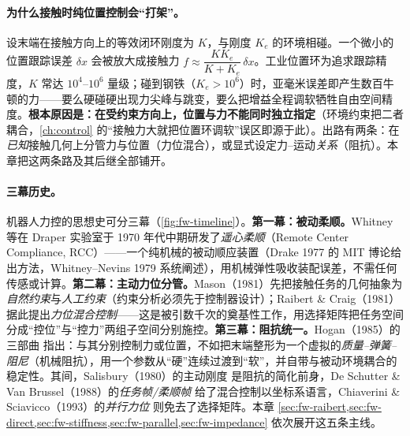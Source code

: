 \paragraph{为什么接触时纯位置控制会“打架”。}
设末端在接触方向上的等效闭环刚度为 $K$，与刚度 $K_e$ 的环境相碰。一个微小的位置跟踪误差 $\delta x$ 会被放大成接触力 $f\approx \dfrac{K K_e}{K+K_e}\,\delta x$。工业位置环为追求跟踪精度，$K$ 常达 $10^4$--$10^6$ 量级；碰到钢铁（$K_e>10^6$）时，亚毫米误差即产生数百牛顿的力——要么硬碰硬出现力尖峰与跳变，要么把增益全程调软牺牲自由空间精度。\textbf{根本原因是：在受约束方向上，位置与力不能同时独立指定}（环境约束把二者耦合，\cref{ch:control} 的“接触力大就把位置环调软”误区即源于此）。出路有两条：在\emph{已知}接触几何上分管力与位置（力位混合），或显式设定力--运动\emph{关系}（阻抗）。本章把这两条路及其后继全部铺开。

\paragraph{三幕历史。}
机器人力控的思想史可分三幕（\cref{fig:fw-timeline}）。\textbf{第一幕：被动柔顺。}Whitney 等在 Draper 实验室于 1970 年代中期研发了\emph{遥心柔顺}（Remote Center Compliance, RCC）——一个纯机械的被动顺应装置（Drake 1977 的 MIT 博论给出方法，Whitney--Nevins 1979 系统阐述），用机械弹性吸收装配误差，不需任何传感或计算。\textbf{第二幕：主动力位分管。}Mason（1981）先把接触任务的几何抽象为\emph{自然约束}与\emph{人工约束}\cite{mason1981compliance}（约束分析必须先于控制器设计）；Raibert \& Craig（1981）据此提出\emph{力位混合控制}\cite{raibert1981hybrid}——这是被引数千次的奠基性工作，用选择矩阵把任务空间分成“控位”与“控力”两组子空间分别施控。\textbf{第三幕：阻抗统一。}Hogan（1985）的三部曲\cite{hogan1985impedance} 指出：与其分别控制力或位置，不如把末端整形为一个虚拟的\emph{质量--弹簧--阻尼}（机械阻抗），用一个参数从“硬”连续过渡到“软”，并自带与被动环境耦合的稳定性。其间，Salisbury（1980）的主动刚度\cite{salisbury1980active} 是阻抗的简化前身，De Schutter \& Van Brussel（1988）的\emph{任务帧/柔顺帧}\cite{deschutter1988compliant} 给了混合控制以坐标系语言，Chiaverini \& Sciavicco（1993）的\emph{并行力位}\cite{chiaverini1993parallel} 则免去了选择矩阵。本章 \cref{sec:fw-raibert,sec:fw-direct,sec:fw-stiffness,sec:fw-parallel,sec:fw-impedance} 依次展开这五条主线。

